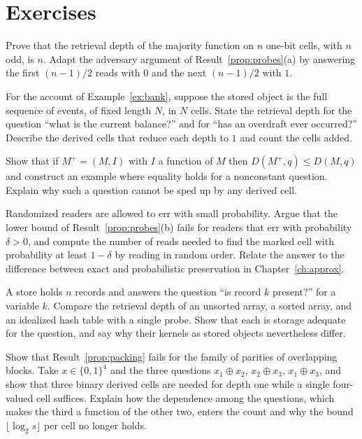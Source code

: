 \section*{Exercises}

\begin{exercise}
Prove that the retrieval depth of the majority function on $n$ one-bit cells, with $n$ odd, is $n$. Adapt the adversary argument of Result~\ref{prop:probes}(a) by answering the first $(n-1)/2$ reads with $0$ and the next $(n-1)/2$ with $1$.
\end{exercise}

\begin{exercise}
For the account of Example~\ref{ex:bank}, suppose the stored object is the full sequence of events, of fixed length $N$, in $N$ cells. State the retrieval depth for the question ``what is the current balance?'' and for ``has an overdraft ever occurred?'' Describe the derived cells that reduce each depth to $1$ and count the cells added.
\end{exercise}

\begin{exercise}
Show that if $M^{+}=(M,I)$ with $I$ a function of $M$ then $D(M^{+},q)\le D(M,q)$ and construct an example where equality holds for a nonconstant question. Explain why such a question cannot be sped up by any derived cell.
\end{exercise}

\begin{exercise}
Randomized readers are allowed to err with small probability. Argue that the lower bound of Result~\ref{prop:probes}(b) fails for readers that err with probability $\delta>0$, and compute the number of reads needed to find the marked cell with probability at least $1-\delta$ by reading in random order. Relate the answer to the difference between exact and probabilistic preservation in Chapter~\ref{ch:approx}.
\end{exercise}

\begin{exercise}
A store holds $n$ records and answers the question ``is record $k$ present?'' for a variable $k$. Compare the retrieval depth of an unsorted array, a sorted array, and an idealized hash table with a single probe. Show that each is storage adequate for the question, and say why their kernels as stored objects nevertheless differ.
\end{exercise}


\begin{exercise}
Show that Result~\ref{prop:packing} fails for the family of parities of overlapping blocks. Take $x\in\{0,1\}^{4}$ and the three questions $x_1\oplus x_2$, $x_2\oplus x_3$, $x_1\oplus x_3$, and show that three binary derived cells are needed for depth one while a single four-valued cell suffices. Explain how the dependence among the questions, which makes the third a function of the other two, enters the count and why the bound $\lfloor\log_2 s\rfloor$ per cell no longer holds.\label{ex:overlap-parity}
\end{exercise}

